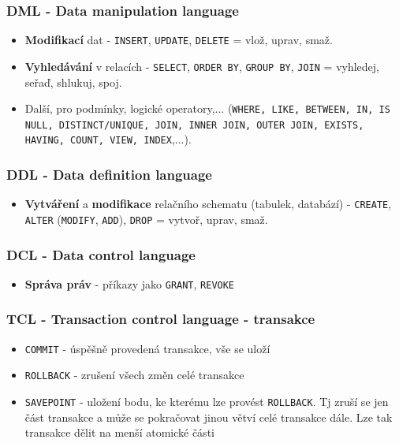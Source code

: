 \subsubsection{DML - Data manipulation language}
\begin{itemize}
	\item \textbf{Modifikací} dat -  \texttt{INSERT}, \texttt{UPDATE}, \texttt{DELETE} = vlož, uprav, smaž.
	\item \textbf{Vyhledávání} v relacích -  \texttt{SELECT}, \texttt{ORDER BY},  \texttt{GROUP BY}, \texttt{JOIN} = vyhledej, seřaď, shlukuj, spoj.	
	\item Další, pro podmínky, logické operatory,... (\texttt{WHERE, LIKE, BETWEEN, IN, IS NULL, DISTINCT/UNIQUE, JOIN, INNER JOIN, OUTER JOIN, EXISTS, HAVING, COUNT, VIEW, INDEX},...).
\end{itemize}

\subsubsection{DDL - Data definition language}
\begin{itemize}
	\item \textbf{Vytváření} a \textbf{modifikace} relačního schematu (tabulek, databází) - \texttt{CREATE}, \texttt{ALTER} (\texttt{MODIFY}, \texttt{ADD}), \texttt{DROP}  = vytvoř, uprav, smaž.
\end{itemize}

\subsubsection{DCL - Data control language}
\begin{itemize}
	\item \textbf{Správa práv} - příkazy jako \texttt{GRANT}, \texttt{REVOKE}
\end{itemize}

\subsubsection{TCL - Transaction control language - transakce}
\begin{itemize}
	\item \texttt{COMMIT} - úspěšně provedená transakce, vše se uloží
	\item \texttt{ROLLBACK} - zrušení všech změn celé transakce
	\item \texttt{SAVEPOINT} - uložení bodu, ke kterému lze provést \texttt{ROLLBACK}. Tj zruší se jen část transakce a může se pokračovat jinou větví celé transakce dále. Lze tak transakce dělit na menší atomické části
\end{itemize}

